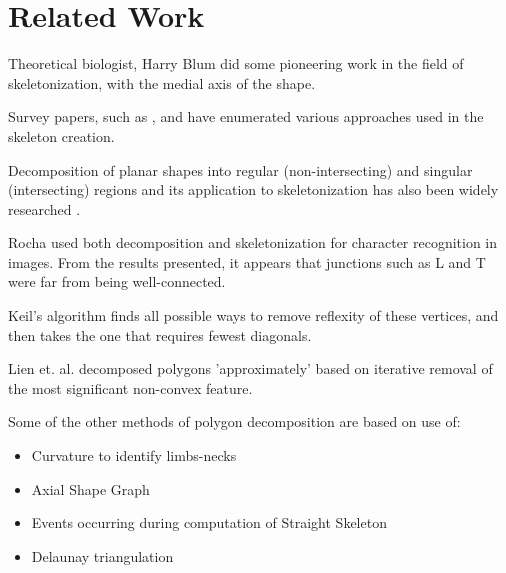 
\section{Related Work}	

Theoretical biologist, Harry Blum \citep{Harry1967} did some pioneering work in the field of skeletonization, with the medial axis of the shape. 

Survey papers, such as \citep{Attali2004}, \citep{Lam1992} and \citep{Yogesh2010} have enumerated various approaches used in the skeleton creation. 

Decomposition of planar shapes  into regular (non-intersecting) and singular (intersecting) regions and its application to skeletonization has also been widely researched \citep{Rocha99}.


Rocha \citep{Rocha98, Rocha99} used both decomposition and skeletonization for character recognition in images. From the results presented, it appears that junctions such as L and T were far from being well-connected.  

Keil's algorithm \citep{Keil94} finds all possible ways to remove reflexity  of  these  vertices,  and  then  takes  the  one  that  requires  fewest diagonals. 

Lien et. al. \citep{Lien2004} decomposed polygons 'approximately' based on iterative removal of the most significant non-convex feature. 

Some of the other methods of polygon decomposition are based on use of:
\begin{itemize}[noitemsep,topsep=1pt,parsep=1pt,partopsep=1pt]
\item Curvature to identify limbs-necks
\item Axial Shape Graph
\item Events occurring during computation of Straight Skeleton
\item Delaunay triangulation
\end{itemize}

